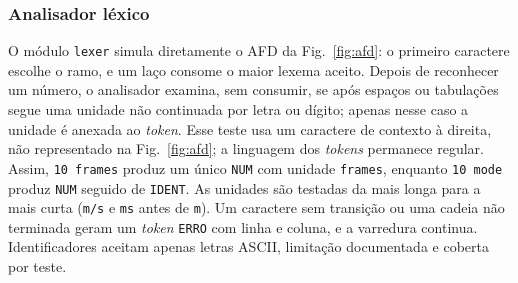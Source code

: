 \documentclass[conference]{IEEEtran}
\begin{document}
\subsubsection{Analisador léxico}
\label{sec:lexer}
O módulo \texttt{lexer} simula diretamente o AFD da Fig.~\ref{fig:afd}: o
primeiro caractere escolhe o ramo, e um laço consome o maior lexema aceito.
Depois de reconhecer um número, o analisador examina, sem consumir, se após
espaços ou tabulações segue uma unidade não continuada por letra ou dígito;
apenas nesse caso a unidade é anexada ao \textit{token}. Esse teste usa um
caractere de contexto à direita, não representado na Fig.~\ref{fig:afd}; a
linguagem dos \textit{tokens} permanece regular. Assim,
\texttt{10 frames} produz um único \texttt{NUM} com unidade \texttt{frames},
enquanto \texttt{10 mode} produz \texttt{NUM} seguido de \texttt{IDENT}. As
unidades são testadas da mais longa para a mais curta (\texttt{m/s} e
\texttt{ms} antes de \texttt{m}). Um caractere sem transição ou uma cadeia não
terminada geram um \textit{token} \texttt{ERRO} com linha e coluna, e a
varredura continua. Identificadores aceitam apenas letras ASCII, limitação
documentada e coberta por teste.
\end{document}
